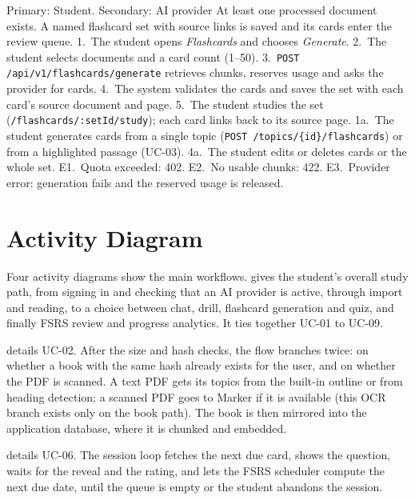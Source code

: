 {Primary: Student. Secondary: AI provider}
{At least one processed document exists.}
{A named flashcard set with source links is saved and its cards enter the review queue.}
{1.~The student opens \emph{Flashcards} and chooses \emph{Generate}. 2.~The student selects
documents and a card count (1--50). 3.~\texttt{POST /api/v1/flashcards/generate} retrieves
chunks, reserves usage and asks the provider for cards. 4.~The system validates the cards and
saves the set with each card's source document and page. 5.~The student studies the set
(\texttt{/flashcards/:setId/study}); each card links back to its source page.}
{1a.~The student generates cards from a single topic (\texttt{POST /topics/\{id\}/flashcards}) or
from a highlighted passage (UC-03). 4a.~The student edits or deletes cards or the whole set.}
{E1.~Quota exceeded: 402. E2.~No usable chunks: 422. E3.~Provider error: generation fails and
the reserved usage is released.}

\clearpage
\section{Activity Diagram}

Four activity diagrams show the main workflows.  gives the student's
overall study path, from signing in and checking that an AI provider is active, through import
and reading, to a choice between chat, drill, flashcard generation and quiz, and finally FSRS
review and progress analytics. It ties together UC-01 to UC-09.


 details UC-02. After the size and hash checks, the flow branches twice:
on whether a book with the same hash already exists for the user, and on whether the PDF is
scanned. A text PDF gets its topics from the built-in outline or from heading detection; a
scanned PDF goes to Marker if it is available (this OCR branch exists only on the book path). The
book is then mirrored into the application database, where it is chunked and embedded.


 details UC-06. The session loop fetches the next due card, shows the
question, waits for the reveal and the rating, and lets the FSRS scheduler compute the next due
date, until the queue is empty or the student abandons the session.

